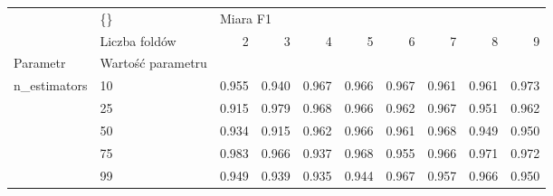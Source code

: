 \begin{tabular}{llrrrrrrrr}
\hline
             & \{\} & \multicolumn{8}{l}{Miara F1} \\
             & Liczba foldów &        2 &      3 &      4 &      5 &      6 &      7 &      8 &      9 \\
Parametr & Wartość parametru &          &        &        &        &        &        &        &        \\
\hline
n\_estimators & 10 &    0.955 &  0.940 &  0.967 &  0.966 &  0.967 &  0.961 &  0.961 &  0.973 \\
             & 25 &    0.915 &  0.979 &  0.968 &  0.966 &  0.962 &  0.967 &  0.951 &  0.962 \\
             & 50 &    0.934 &  0.915 &  0.962 &  0.966 &  0.961 &  0.968 &  0.949 &  0.950 \\
             & 75 &    0.983 &  0.966 &  0.937 &  0.968 &  0.955 &  0.966 &  0.971 &  0.972 \\
             & 99 &    0.949 &  0.939 &  0.935 &  0.944 &  0.967 &  0.957 &  0.966 &  0.950 \\
\hline
\end{tabular}
